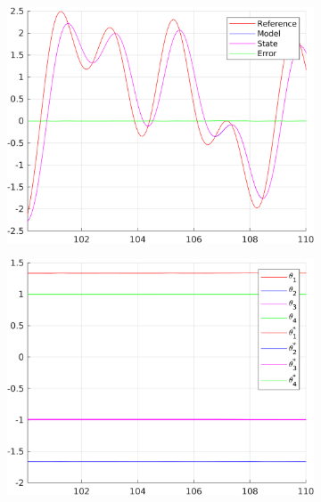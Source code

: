 \documentclass[12pt,a4paper]{article}
\begin{document}
	\begin{figure}[H]
		\centering
		\begin{subfigure}{.45\textwidth}
			\centering
			\includegraphics[width=1\textwidth]{Graphics/NonLinearStateZero2.png}
		\end{subfigure}%
		\begin{subfigure}{.45\textwidth}
			\centering
			\includegraphics[width=1\textwidth]{Graphics/NonLinearParametersZero2.png}
		\end{subfigure}
		\begin{subfigure}{.45\textwidth}
			\centering

\end{subfigure}
\end{figure}
\end{document}
